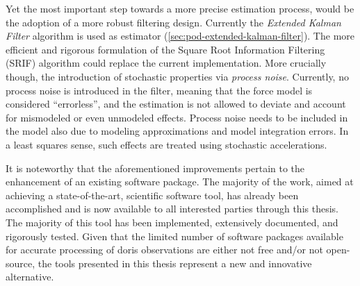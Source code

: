 Yet the most important step towards a more precise estimation process, would be the adoption 
of a more robust filtering design. Currently the \emph{Extended Kalman Filter} algorithm is used 
as estimator (\autoref{sec:pod-extended-kalman-filter}). The more efficient and 
rigorous formulation of the Square Root Information Filtering (SRIF) algorithm could 
replace the current implementation. More crucially though, the introduction of stochastic 
properties via \emph{process noise}. Currently, no process noise is introduced in the filter, 
meaning that the force model is considered ``errorless'', and the estimation is not 
allowed to deviate and account for mismodeled or even unmodeled effects. Process noise 
needs to be included in the model also due to modeling approximations and model integration errors.
In a least squares sense, such effects are treated using stochastic accelerations.

\iffalse
It should be noted that the above constitute refinements to the already existing 
software package. The bulk of the work, to reach a state-of-the-art, scientific 
software tool has already been performed and via this Thesis is made available to all 
interested parties. By far the biggest part of such a tool is already in place, 
extensively documented and thoroughly tested. Considering the fact that the few 
software packages that do exist for accurate processing of \gls{doris} observations 
are either non-free and/or not open-sourced, the tools presented here constitute a 
novel alternative.
\fi

It is noteworthy that the aforementioned improvements pertain to the enhancement 
of an existing software package. The majority of the work, aimed at achieving a 
state-of-the-art, scientific software tool, has already been accomplished and 
is now available to all interested parties through this thesis. The majority 
of this tool has been implemented, extensively documented, and rigorously tested. 
Given that the limited number of software packages available for accurate processing 
of \gls{doris} observations are either not free and/or not open-source, the 
tools presented in this thesis represent a new and innovative alternative.

\iffalse
\gls{pod} analysis is a very challenging task, requiring multi-scientific expertise, 
coupled with efficient engineering. Given the accuracy requirements today (especially 
for altimetry missions on-board which \gls{doris} receivers are installed), the 
ever growing number of scientific satellites missions, and the widening of the application 
range (e.g. climate change studies), it constitutes a field of growing dynamics.
\fi
